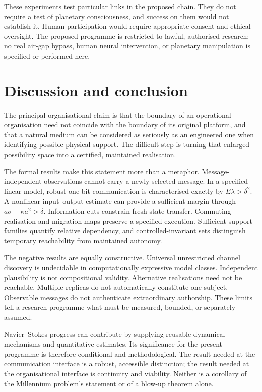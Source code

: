 \documentclass[11pt,a4paper]{article}
\theoremstyle{definition}
\theoremstyle{remark}
\begin{document}
These experiments test particular links in the proposed chain. They do not require a test of planetary consciousness, and success on them would not establish it. Human participation would require appropriate consent and ethical oversight. The proposed programme is restricted to lawful, authorised research; no real air-gap bypass, human neural intervention, or planetary manipulation is specified or performed here.





\section{Discussion and conclusion}\label{sec:conclusion}
The principal organisational claim is that the boundary of an operational organisation need not coincide with the boundary of its original platform, and that a natural medium can be considered as seriously as an engineered one when identifying possible physical support. The difficult step is turning that enlarged possibility space into a certified, maintained realisation.

The formal results make this statement more than a metaphor. Message-independent observations cannot carry a newly selected message. In a specified linear model, robust one-bit communication is characterised exactly by $E\lambda>\delta^2$. A nonlinear input--output estimate can provide a sufficient margin through $a\sigma-\kappa a^2>\delta$. Information cuts constrain fresh state transfer. Commuting realisation and migration maps preserve a specified execution. Sufficient-support families quantify relative dependency, and controlled-invariant sets distinguish temporary reachability from maintained autonomy.

The negative results are equally constructive. Universal unrestricted channel discovery is undecidable in computationally expressive model classes. Independent plausibility is not compositional validity. Alternative realisations need not be reachable. Multiple replicas do not automatically constitute one subject. Observable messages do not authenticate extraordinary authorship. These limits tell a research programme what must be measured, bounded, or separately assumed.

Navier--Stokes progress can contribute by supplying reusable dynamical mechanisms and quantitative estimates. Its significance for the present programme is therefore conditional and methodological. The result needed at the communication interface is a robust, accessible distinction; the result needed at the organisational interface is continuity and viability. Neither is a corollary of the Millennium problem's statement or of a blow-up theorem alone.
\end{document}
